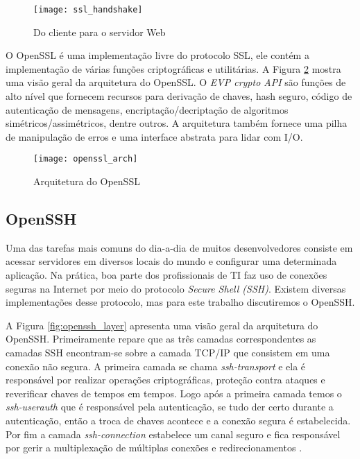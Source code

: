 \begin{figure}[!h]
  \centering
  \texttt{[image: ssl\_handshake]}
  \caption{Do cliente para o servidor Web}
  \label{fig:openssl_handshake}
\end{figure}

O OpenSSL é uma implementação livre do protocolo SSL, ele contém a
implementação de várias funções criptográficas e utilitárias. A Figura
\ref{fig:openssl_arch} mostra uma visão geral da arquitetura do OpenSSL. O
\textit{EVP crypto API} são funções de alto nível que fornecem recursos para
derivação de chaves, hash seguro, código de autenticação de mensagens,
encriptação/decriptação de algoritmos simétricos/assimétricos, dentre outros. A
arquitetura também fornece uma pilha de manipulação de erros e uma interface
abstrata para lidar com I/O.

\begin{figure}[!h]
  \centering
  \texttt{[image: openssl\_arch]}
  \caption{Arquitetura do OpenSSL \citep{crypto_openssl}}
  \label{fig:openssl_arch}
\end{figure}

\subsection{OpenSSH}

Uma das tarefas mais comuns do dia-a-dia de muitos desenvolvedores consiste em
acessar servidores em diversos locais do mundo e configurar uma determinada
aplicação. Na prática, boa parte dos profissionais de TI faz uso de conexões
seguras na Internet por meio do protocolo \textit{Secure Shell (SSH)}. Existem
diversas implementações desse protocolo, mas para este trabalho discutiremos o
OpenSSH.

A Figura \ref{fig:openssh_layer} apresenta uma visão geral da arquitetura do
OpenSSH. Primeiramente repare que as três camadas correspondentes as camadas
SSH encontram-se sobre a camada TCP/IP que consistem em uma conexão não segura.
A primeira camada se chama \textit{ssh-transport} e ela é responsável por
realizar operações criptográficas, proteção contra ataques e reverificar chaves
de tempos em tempos. Logo após a primeira camada temos o \textit{ssh-userauth}
que é responsável pela autenticação, se tudo der certo durante a autenticação,
então a troca de chaves acontece e a conexão segura é estabelecida. Por fim a
camada \textit{ssh-connection} estabelece um canal seguro e fica responsável
por gerir a multiplexação de múltiplas conexões e redirecionamentos
\citep{proopenssh, opensshhood}.


